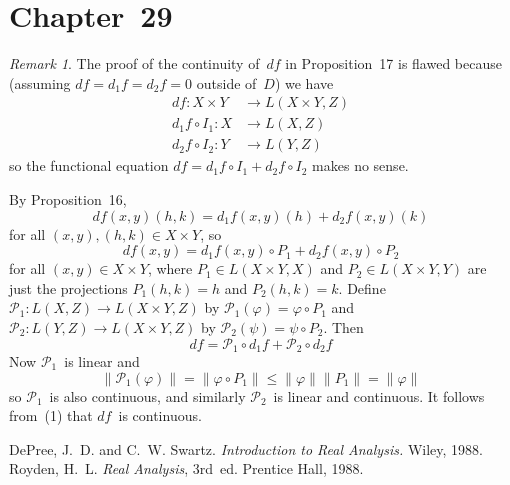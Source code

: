 \documentclass[letterpaper,12pt]{article}
\renewcommand{\P}{\mathcal{P}}
\newcommand{\after}{\circ}
\newcommand{\df}{d\!f}
\newcommand{\norm}[1]{\lVert{#1}\rVert}
\theoremstyle{plain}
\theoremstyle{definition}
\theoremstyle{remark}
\newtheorem*{rmk}{Remark}
\begin{document}
\section*{Chapter~29}
\begin{rmk}
The proof of the continuity of~\(\df\) in Proposition~17 is flawed because (assuming \(\df=d_1f=d_2f=0\) outside of~\(D\)) we have
\begin{align*}
\df:X\times Y&\to L(X\times Y,Z)\\
d_1f\after I_1:X&\to L(X,Z)\\
d_2f\after I_2:Y&\to L(Y,Z)
\end{align*}
so the functional equation \(\df=d_1f\after I_1+d_2f\after I_2\) makes no sense.

By Proposition~16,
\[\df(x,y)(h,k)=d_1f(x,y)(h)+d_2f(x,y)(k)\]
for all \((x,y),(h,k)\in X\times Y\), so
\[\df(x,y)=d_1f(x,y)\after P_1+d_2f(x,y)\after P_2\]
for all \((x,y)\in X\times Y\), where \(P_1\in L(X\times Y,X)\) and \(P_2\in L(X\times Y,Y)\) are just the projections \(P_1(h,k)=h\) and \(P_2(h,k)=k\). Define \(\P_1:L(X,Z)\to L(X\times Y,Z)\) by \(\P_1(\varphi)=\varphi\after P_1\) and \(\P_2:L(Y,Z)\to L(X\times Y,Z)\) by \(\P_2(\psi)=\psi\after P_2\). Then
\[\df=\P_1\after d_1f+\P_2\after d_2f\tag{1}\]
Now \(\P_1\)~is linear and
\[\norm{\P_1(\varphi)}=\norm{\varphi\after P_1}\le\norm{\varphi}\norm{P_1}=\norm{\varphi}\]
so \(\P_1\)~is also continuous, and similarly \(\P_2\)~is linear and continuous. It follows from~(1) that \(\df\)~is continuous.
\end{rmk}

\begin{thebibliography}{0}
 DePree, J.~D. and C.~W. Swartz. \textit{Introduction to Real Analysis.} Wiley, 1988.
 Royden, H.~L. \textit{Real Analysis}, 3rd~ed. Prentice Hall, 1988.
\end{thebibliography}
\end{document}
